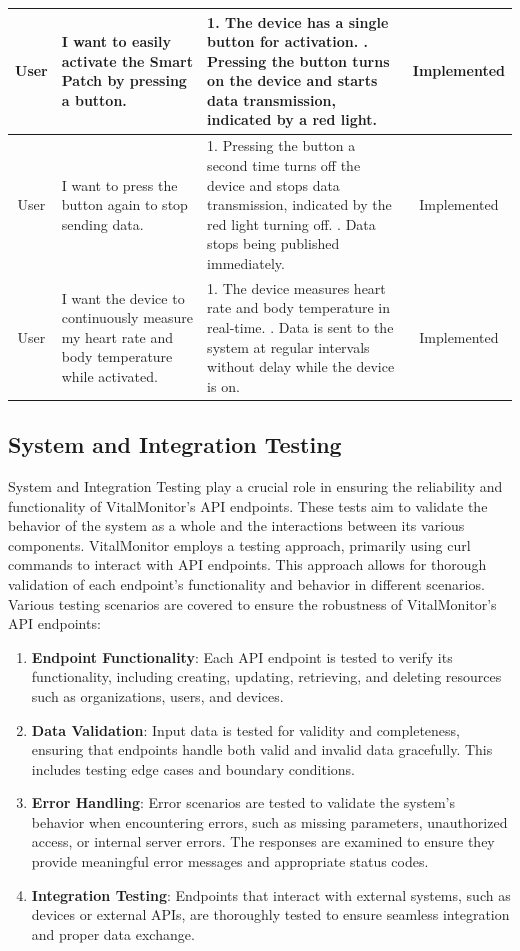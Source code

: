 \begin{longtable}{|c|p{4cm}|p{5cm}|c|}
\hline
User & I want to easily activate the Smart Patch by pressing a button. & 1. The device has a single button for activation. \newline 2. Pressing the button turns on the device and starts data transmission, indicated by a red light. & Implemented \\
\hline
User & I want to press the button again to stop sending data. & 1. Pressing the button a second time turns off the device and stops data transmission, indicated by the red light turning off. \newline 2. Data stops being published immediately. & Implemented \\
\hline
User & I want the device to continuously measure my heart rate and body temperature while activated. & 1. The device measures heart rate and body temperature in real-time. \newline 2. Data is sent to the system at regular intervals without delay while the device is on. & Implemented \\
\hline
\end{longtable}


\subsection{System and Integration Testing}

System and Integration Testing play a crucial role in ensuring the reliability and functionality of VitalMonitor's API endpoints. These tests aim to validate the behavior of the system as a whole and the interactions between its various components. VitalMonitor employs a testing approach, primarily using curl commands to interact with API endpoints. This approach allows for thorough validation of each endpoint's functionality and behavior in different scenarios.  \\

\noindent Various testing scenarios are covered to ensure the robustness of VitalMonitor's API endpoints:
\begin{enumerate}
    \item \textbf{Endpoint Functionality}: Each API endpoint is tested to verify its functionality, including creating, updating, retrieving, and deleting resources such as organizations, users, and devices.
    \item \textbf{Data Validation}: Input data is tested for validity and completeness, ensuring that endpoints handle both valid and invalid data gracefully. This includes testing edge cases and boundary conditions.
    \item \textbf{Error Handling}: Error scenarios are tested to validate the system's behavior when encountering errors, such as missing parameters, unauthorized access, or internal server errors. The responses are examined to ensure they provide meaningful error messages and appropriate status codes.
    \item \textbf{Integration Testing}: Endpoints that interact with external systems, such as devices or external APIs, are thoroughly tested to ensure seamless integration and proper data exchange.
\end{enumerate}

